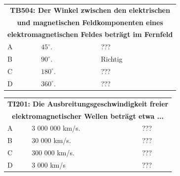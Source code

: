 \begin{frame}
	\begin{center}
	\begin{tabular}{|l|l|l|}
		\hline
		\multicolumn{3}{|c|}{\textbf{TB504:  Der Winkel zwischen den elektrischen}}\\
		\multicolumn{3}{|c|}{\textbf{und magnetischen Feldkomponenten eines}}\\
		\multicolumn{3}{|c|}{\textbf{elektromagnetischen Feldes beträgt im Fernfeld}}\\
		\hline
		A & $45^\circ$.  & ??? \\ \hline
		B & $90^\circ$.  & Richtig \\ \hline
		C & $180^\circ$. & ??? \\ \hline
		D & $360^\circ$. & ??? \\ \hline
	\end{tabular}
	\end{center}
\end{frame}

\begin{frame}
	\begin{center}
	\begin{tabular}{|l|l|l|}
		\hline
		\multicolumn{3}{|c|}{\textbf{TI201: Die Ausbreitungsgeschwindigkeit freier}}\\
		\multicolumn{3}{|c|}{\textbf{elektromagnetischer Wellen beträgt etwa ...}}\\
		\hline
		A & 3 000 000 km/s. & ??? \\ \hline
		B & 30 000 km/s.    & ??? \\ \hline
		C & 300 000 km/s.   & ??? \\ \hline
		D & 3 000 km/s      & ??? \\ \hline
	\end{tabular}
	\end{center}
\end{frame}

